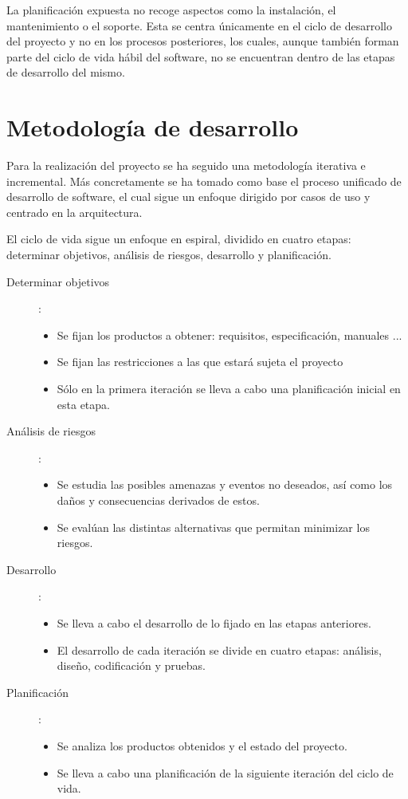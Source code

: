 La planificación expuesta no recoge aspectos como la instalación, el mantenimiento o el soporte. Esta se centra únicamente en el ciclo de desarrollo
del proyecto y no en los procesos posteriores, los cuales, aunque también forman parte del ciclo de vida hábil del software, no se encuentran dentro de 
las etapas de desarrollo del mismo.

\section{Metodología de desarrollo}

Para la realización del proyecto se ha seguido una metodología iterativa e incremental. Más concretamente se ha tomado como
base el proceso unificado de desarrollo de software, el cual sigue un enfoque dirigido por casos de uso y centrado en 
la arquitectura. 

El ciclo de vida sigue un enfoque en espiral, dividido en cuatro etapas: determinar objetivos, análisis de riesgos, desarrollo y planificación.

\begin{description}
\item[Determinar objetivos]: 
   \begin {itemize}
   \item Se fijan los productos a obtener: requisitos, especificación, manuales ...
   \item Se fijan las restricciones a las que estará sujeta el proyecto
   \item Sólo en la primera iteración se lleva a cabo una planificación inicial en esta etapa.
   \end{itemize}
\item[Análisis de riesgos]: 
   \begin {itemize}
   \item Se estudia las posibles amenazas y eventos no deseados, así como los daños y consecuencias derivados de estos.
   \item Se evalúan las distintas alternativas que permitan minimizar los riesgos.
   \end{itemize}
\item[Desarrollo]: 
   \begin {itemize}
   \item Se lleva a cabo el desarrollo de lo fijado en las etapas anteriores.
   \item El desarrollo de cada iteración se divide en cuatro etapas: análisis, diseño, codificación y pruebas.
   \end{itemize}
\item[Planificación]:
   \begin {itemize}
   \item Se analiza los productos obtenidos y el estado del proyecto.
   \item Se lleva a cabo una planificación de la siguiente iteración del ciclo de vida.
   \end{itemize}
\end{description}

